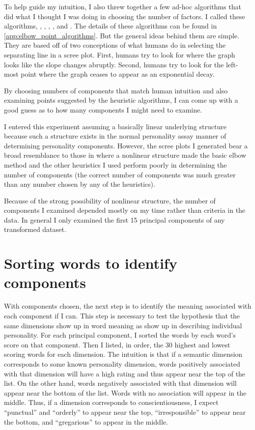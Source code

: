 To help guide my intuition, I also threw together a few ad-hoc algorithms that 
did what I thought I was doing in choosing the number of factors. I called 
these algorithms, , , 
, , and 
. The details of these algorithms can 
be found in \ref{app:elbow_point_algorithms}. But the general ideas behind them 
are simple. They are based off of two conceptions of what humans do in selecting 
the separating line in a scree plot. First, humans try to look for where the 
graph looks like the slope changes abruptly. Second, humans try to look for the 
left-most point where the graph ceases to appear as an exponential decay.

By choosing numbers of components that match human intuition and also
examining points suggested by the heuristic algorithms, I can come up
with a good guess as to how many components I might need to examine.

I entered this experiment assuming a basically linear underlying
structure because such a structure exists in the normal personality
assay manner of determining personality components. However, the scree
plots I generated bear a broad resemblance to those in  where a nonlinear structure
made the basic elbow method and the other heuristics I used perform
poorly in determining the number of components (the correct number of
components was much greater than any number chosen by any of the
heuristics).

Because of the strong possibility of nonlinear structure, the number
of components I examined depended mostly on my time rather than
criteria in the data. In general I only examined the first 15
principal components of any transformed dataset.

\section{Sorting words to identify components}

With components chosen, the next 
step is to identify the meaning associated with each component if I can. This 
step is necessary to test the hypothesis that the same dimensions show up in 
word meaning as show up in describing individual personality. For each 
principal 
component, I sorted the words by each word's score on that component. Then I 
listed, in order, the 30 highest and lowest scoring words for each dimension. 
The intuition is that if a semantic dimension corresponds to some known 
personality dimension, words positively associated with that dimension will 
have 
a high rating and thus appear near the top of the list. On the other hand, 
words 
negatively associated with that dimension will appear near the bottom of the 
list. Words with no association will appear in the middle. Thus, if a dimension 
corresponds to conscientiousness, I expect ``punctual'' and ``orderly'' to 
appear near the top, ``irresponsible'' to appear near the bottom, and ``gregarious''
to appear in the middle.


